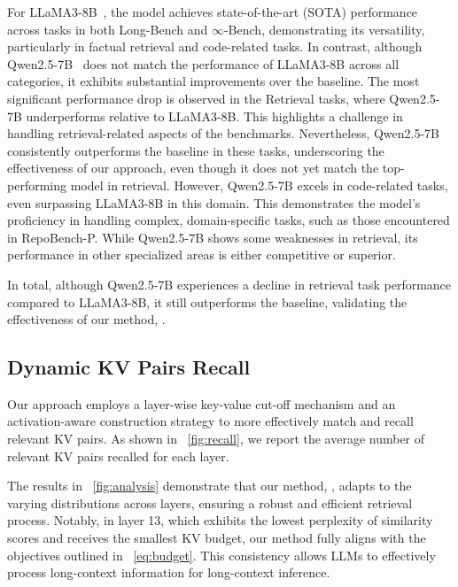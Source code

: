 For LLaMA3-8B~\cite{llama3}, the model achieves state-of-the-art (SOTA) performance across tasks in both Long-Bench and $\infty$-Bench, demonstrating its versatility, particularly in factual retrieval and code-related tasks.
In contrast, although Qwen2.5-7B~\cite{qwen2.5} does not match the performance of LLaMA3-8B across all categories, it exhibits substantial improvements over the baseline. The most significant performance drop is observed in the Retrieval tasks, where Qwen2.5-7B underperforms relative to LLaMA3-8B. This highlights a challenge in handling retrieval-related aspects of the benchmarks. Nevertheless, Qwen2.5-7B consistently outperforms the baseline in these tasks, underscoring the effectiveness of our approach, even though it does not yet match the top-performing model in retrieval. However, Qwen2.5-7B excels in code-related tasks, even surpassing LLaMA3-8B in this domain. This demonstrates the model’s proficiency in handling complex, domain-specific tasks, such as those encountered in RepoBench-P. While Qwen2.5-7B shows some weaknesses in retrieval, its performance in other specialized areas is either competitive or superior.

In total, although Qwen2.5-7B experiences a decline in retrieval task performance compared to LLaMA3-8B, it still outperforms the baseline, validating the effectiveness of our method, \name.

\subsection{Dynamic KV Pairs Recall}

Our approach employs a layer-wise key-value cut-off mechanism and an activation-aware \pq construction strategy to more effectively match and recall relevant KV pairs. As shown in ~\cref{fig:recall}, we report the average number of relevant KV pairs recalled for each layer.

The results in ~\cref{fig:analysis} demonstrate that our method, \name, adapts to the varying distributions across layers, ensuring a robust and efficient retrieval process. Notably, in layer 13, which exhibits the lowest perplexity of similarity scores and receives the smallest KV budget, our method fully aligns with the objectives outlined in ~\cref{eq:budget}. This consistency allows LLMs to effectively process long-context information for long-context inference.





